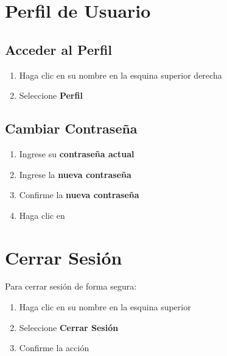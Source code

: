 \documentclass[12pt,a4paper]{article}
\begin{document}
\newpage

\section{Perfil de Usuario}

\subsection{Acceder al Perfil}

\begin{enumerate}
    \item Haga clic en su nombre en la esquina superior derecha
    \item Seleccione \textbf{Perfil} \faUser
\end{enumerate}

\subsection{Cambiar Contraseña}

\begin{tcolorbox}[colback=blue!10,colframe=blue,title=\faLock~ Cambiar Contraseña]
\begin{enumerate}
    \item Ingrese su \textbf{contraseña actual}
    \item Ingrese la \textbf{nueva contraseña}
    \item Confirme la \textbf{nueva contraseña}
    \item Haga clic en 
\end{enumerate}
\end{tcolorbox}

\newpage

\section{Cerrar Sesión}

\begin{tcolorbox}[colback=red!10,colframe=red,title=\faSignOutAlt~ Salir del Sistema]
Para cerrar sesión de forma segura:

\begin{enumerate}
    \item Haga clic en su nombre en la esquina superior
    \item Seleccione \textbf{Cerrar Sesión}
    \item Confirme la acción
\end{enumerate}
\end{tcolorbox}
\end{document}
